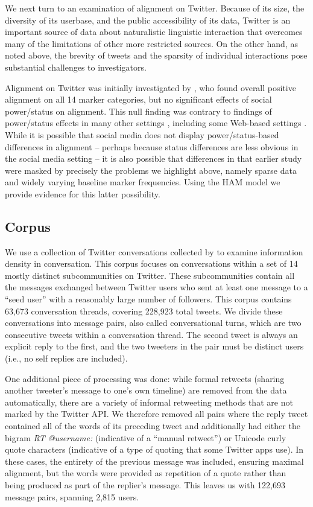 \documentclass{acm_proc_article-sp}
\begin{document}
We next turn to an examination of alignment on Twitter. Because of its size, the diversity of its userbase, and the public accessibility of its data, Twitter is an important source of data about naturalistic linguistic interaction that overcomes many of the limitations of other more restricted sources. On the other hand, as noted above, the brevity of tweets and the sparsity of individual interactions pose substantial challenges to investigators. 

Alignment on Twitter was initially investigated by \cite{DNMGamonDumais2011}, who found overall positive alignment on all 14 marker categories, but no significant effects of social power/status on alignment. This null finding was contrary to findings of power/status effects in many other settings \cite{Gnisci2005}, including some Web-based settings \cite{DNMEtAl2012,NobleFernandez2015}. While it is possible that social media does not display power/status-based differences in alignment -- perhaps because status differences are less obvious in the social media setting -- it is also possible that differences in that earlier study were masked by precisely the problems we highlight above, namely sparse data and widely varying baseline marker frequencies. Using the HAM model we provide evidence for this latter possibility.

\subsection{Corpus}

We use a collection of Twitter conversations collected by \cite{DoyleFrank2015CMCL} to examine information density in conversation. This corpus focuses on conversations within a set of 14 mostly distinct subcommunities on Twitter.  These subcommunities contain all the messages exchanged between Twitter users who sent at least one message to a ``seed user'' with a reasonably large number of followers. This corpus contains 63,673 conversation threads, covering 228,923 total tweets.  We divide these conversations into message pairs, also called conversational turns, which are two consecutive tweets within a conversation thread.  The second tweet is always an explicit reply to the first, and the two tweeters in the pair must be distinct users (i.e., no self replies are included).  

One additional piece of processing was done: while formal retweets (sharing another tweeter's message to one's own timeline) are removed from the data automatically, there are a variety of informal retweeting methods that are not marked by the Twitter API.  We therefore removed all pairs where the reply tweet contained all of the words of its preceding tweet and additionally had either the bigram \textit{RT @username:} (indicative of a ``manual retweet'') or Unicode curly quote characters (indicative of a type of quoting that some Twitter apps use).  In these cases, the entirety of the previous message was included, ensuring maximal alignment, but the words were provided as repetition of a quote rather than being produced as part of the replier's message.  This leaves us with 122,693 message pairs, spanning 2,815 users.
\end{document}

